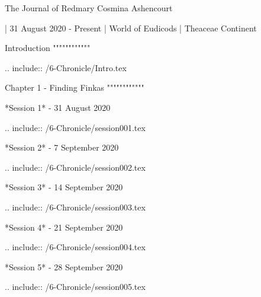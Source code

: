 The Journal of Redmary Cosmina Ashencourt
^^^^^^^^^^^^^^^^^^^^^^^^^^^^^^^^^^^^

| 31 August 2020 - Present
| World of Eudicods
| Theaceae Continent


	
	Introduction
	""""""""""""
	
		.. include:: /6-Chronicle/Intro.tex

	
	Chapter 1 - Finding Finkas
	""""""""""""
		
		*Session 1* - 31 August 2020
		
			.. include:: /6-Chronicle/session001.tex

		*Session 2* - 7 September 2020
		
			.. include:: /6-Chronicle/session002.tex
			
		*Session 3* - 14 September 2020
		
			.. include:: /6-Chronicle/session003.tex
		
		*Session 4* - 21 September 2020	
		
			.. include:: /6-Chronicle/session004.tex
		
		*Session 5* - 28 September 2020
		
			.. include:: /6-Chronicle/session005.tex
